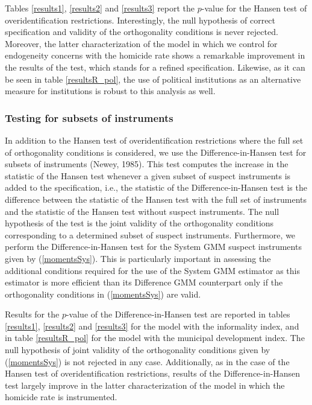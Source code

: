 \documentclass[12pt,a4paper,english]{article}%
\begin{document}
Tables \ref{results1}, \ref{results2} and \ref{results3} report the $p$-value for the Hansen test of overidentification restrictions. Interestingly, the null hypothesis of correct specification and validity of the orthogonality conditions is never rejected. Moreover, the latter characterization of the model in which we control for endogeneity concerns with the homicide rate shows a remarkable improvement in the results of the test, which stands for a refined specification. Likewise, as it can be seen in table \ref{resultsR_pol}, the use of political institutions as an alternative measure for institutions is robust to this analysis as well.

\subsubsection*{Testing for subsets of instruments}

In addition to the Hansen test of overidentification restrictions where the full set of orthogonality conditions is considered, we use the Difference-in-Hansen test for subsets of instruments (Newey, 1985). This test computes the increase in the statistic of the Hansen test whenever a given subset of suspect instruments is added to the specification, i.e., the statistic of the Difference-in-Hansen test is the difference between the statistic of the Hansen test with the full set of instruments and the statistic of the Hansen test without suspect instruments. The null hypothesis of the test is the joint validity of the orthogonality conditions corresponding to a determined subset of suspect instruments. Furthermore, we perform the Difference-in-Hansen test for the System GMM suspect instruments given by (\ref{momentsSys}). This is particularly important in assessing the additional conditions required for the use of the System GMM estimator as this estimator is more efficient than its Difference GMM counterpart only if the orthogonality conditions in (\ref{momentsSys}) are valid.

Results for the $p$-value of the Difference-in-Hansen test are reported in tables \ref{results1}, \ref{results2} and \ref{results3} for the model with the informality index, and in table \ref{resultsR_pol} for the model with the municipal development index. The null hypothesis of joint validity of the orthogonality conditions given by (\ref{momentsSys}) is not rejected in any case. Additionally, as in the case of the Hansen test of overidentification restrictions, results of the Difference-in-Hansen test largely improve in the latter characterization of the model in which the homicide rate is instrumented.
\end{document}
